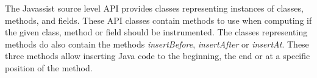 The Javassist source level API provides classes representing instances of classes, methods, and fields. These API classes contain methods to use when computing if the given class, method or field should be instrumented. The classes representing methods do also contain the methods \textit{insertBefore}, \textit{insertAfter} or \textit{insertAt}. These three methods allow inserting Java code to the beginning, the end or at a specific position of the method.
